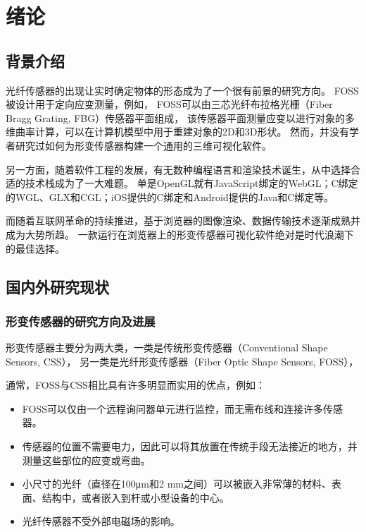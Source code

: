 \cleardoublepage

\section{绪论}

\subsection{背景介绍}

光纤传感器的出现让实时确定物体的形态成为了一个很有前景的研究方向\cite{recent-dev-in-foss}。
FOSS被设计用于定向应变测量，例如，
FOSS可以由三芯光纤布拉格光栅（Fiber Bragg Grating, FBG）传感器平面组成，
该传感器平面测量应变以进行对象的多维曲率计算，可以在计算机模型中用于重建对象的2D和3D形状。
然而，并没有学者研究过如何为形变传感器构建一个通用的三维可视化软件。

另一方面，随着软件工程的发展，有无数种编程语言和渲染技术诞生，从中选择合适的技术栈成为了一大难题。
单是OpenGL就有JavaScript绑定的WebGL；C绑定的WGL、GLX和CGL；iOS提供的C绑定和Android提供的Java和C绑定等。

而随着互联网革命的持续推进，基于浏览器的图像渲染、数据传输技术逐渐成熟并成为大势所趋。
一款运行在浏览器上的形变传感器可视化软件绝对是时代浪潮下的最佳选择。

\subsection{国内外研究现状}

\subsubsection{形变传感器的研究方向及进展}

形变传感器主要分为两大类，一类是传统形变传感器（Conventional Shape Sensors, CSS），
另一类是光纤形变传感器（Fiber Optic Shape Sensors, FOSS）， 

通常，FOSS与CSS相比具有许多明显而实用的优点，例如：

\begin{itemize}
\item FOSS可以仅由一个远程询问器单元进行监控，而无需布线和连接许多传感器。
\item 传感器的位置不需要电力，因此可以将其放置在传统手段无法接近的地方，并测量这些部位的应变或弯曲。
\item 小尺寸的光纤（直径在100μm和2 mm之间）可以被嵌入非常薄的材料、表面、结构中，或者嵌入到杆或小型设备的中心。
\item 光纤传感器不受外部电磁场的影响。
\end{itemize}

